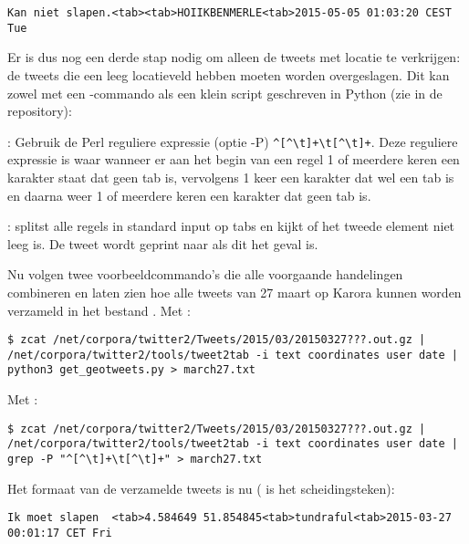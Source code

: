 {{\begin{lstlisting}
Kan niet slapen.<tab><tab>HOIIKBENMERLE<tab>2015-05-05 01:03:20 CEST Tue 
\end{lstlisting}

Er is dus nog een derde stap nodig om alleen de tweets met locatie te 
verkrijgen: de tweets die een leeg locatieveld hebben moeten worden 
overgeslagen. Dit kan zowel met een -commando als een klein script 
geschreven in Python (zie  in de repository):

\begin{bullets}
\item {}: Gebruik de Perl reguliere expressie (optie -P) 
\verb|^[^\t]+\t[^\t]+|. Deze reguliere expressie is waar wanneer er aan het 
begin van een regel 1 of meerdere keren een karakter staat dat geen tab is, 
vervolgens 1 keer een karakter dat wel een tab is en daarna weer 1 of meerdere 
keren een karakter dat geen tab is.
\item {}: splitst alle regels in standard input op tabs en 
kijkt of 
het tweede element niet leeg is. De tweet wordt geprint naar  als dit het geval is.
\end{bullets}

Nu volgen twee voorbeeldcommando's die alle voorgaande handelingen combineren en laten zien 
hoe alle tweets van 27 maart op Karora kunnen worden verzameld in het bestand 
.
\vl
Met :
\begin{lstlisting}
$ zcat /net/corpora/twitter2/Tweets/2015/03/20150327???.out.gz | 
/net/corpora/twitter2/tools/tweet2tab -i text coordinates user date | 
python3 get_geotweets.py > march27.txt
\end{lstlisting}

Met :
\begin{lstlisting}
$ zcat /net/corpora/twitter2/Tweets/2015/03/20150327???.out.gz | 
/net/corpora/twitter2/tools/tweet2tab -i text coordinates user date | 
grep -P "^[^\t]+\t[^\t]+" > march27.txt
\end{lstlisting}

Het formaat van de verzamelde tweets is nu ( is het scheidingsteken):
\begin{lstlisting}
Ik moet slapen	<tab>4.584649 51.854845<tab>tundraful<tab>2015-03-27 00:01:17 CET Fri 
\end{lstlisting}
\vspace*{-10pt}

}}
